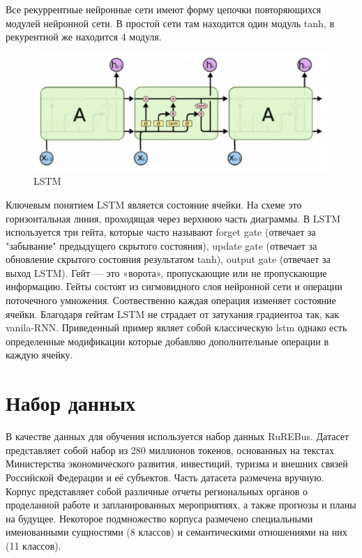 \documentclass{article}
\begin{document}
Все рекуррентные нейронные сети имеют форму цепочки повторяющихся модулей нейронной сети. В простой сети там находится один модуль tanh, в рекурентной же находится 4 модуля.

\begin{figure}[!tbh]
    \centering
    \includegraphics[width=0.9\linewidth]{3.png}
    \caption{LSTM}
    \label{fig:circle}
\end{figure}

Ключевым понятием LSTM является состояние ячейки. На схеме это горизонтальная линия, проходящая через верхнюю часть диаграммы. В LSTM используется три гейта, которые часто называют forget gate (отвечает за "забывание" предыдущего скрытого состояния), update gate (отвечает за обновление скрытого состояния результатом tanh), output gate (отвечает за выход LSTM). Гейт — это «ворота», пропускающие или не пропускающие информацию. Гейты состоят из сигмовидного слоя нейронной сети и операции поточечного умножения. Соотвественно каждая операция изменяет состояние ячейки. Благодаря гейтам LSTM не страдает от затухания градиентоа так, как vanila-RNN. Приведенный пример являет собой классическую lstm однако есть определенные модификации которые добавляю дополнительные операции в каждую ячейку.

\section{Набор данных}
В качестве данных для обучения используется набор данных RuREBus. Датасет представляет собой набор из 280 миллионов токенов, основанных на текстах Министерства экономического развития, инвестиций, туризма и внешних связей Российской Федерации и её субъектов. Часть датасета размечена вручную. Корпус представляет собой различные отчеты региональных органов о проделанной работе и запланированных мероприятиях, а также прогнозы и планы на будущее. Некоторое подмножество корпуса размечено специальными именованными сущностями (8 классов) и семантическими отношениями на них (11 классов).
\end{document}
